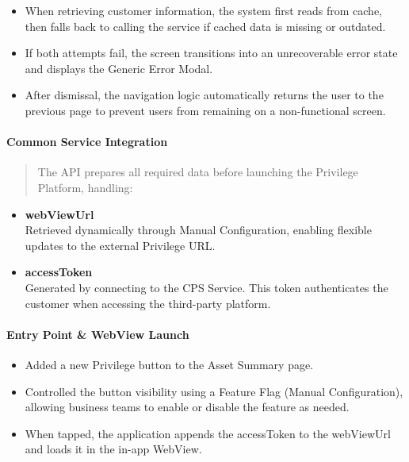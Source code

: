 \begin{itemize}
\item
  When retrieving customer information, the system first reads from
  cache, then falls back to calling the service if cached data is
  missing or outdated.
\item
  If both attempts fail, the screen transitions into an unrecoverable
  error state and displays the Generic Error Modal.
\item
  After dismissal, the navigation logic automatically returns the user
  to the previous page to prevent users from remaining on a
  non-functional screen.
\end{itemize}

\paragraph{\texorpdfstring{\textbf{Common Service
Integration}}{Common Service Integration}}\label{common-service-integration}

\begin{quote}
The API prepares all required data before launching the Privilege
Platform, handling:
\end{quote}

\begin{itemize}
\item
  \textbf{webViewUrl}\\
  Retrieved dynamically through Manual Configuration, enabling flexible
  updates to the external Privilege URL.
\item
  \textbf{accessToken\\
  }Generated by connecting to the CPS Service. This token authenticates
  the customer when accessing the third-party platform.
\end{itemize}

\paragraph{\texorpdfstring{\textbf{Entry Point \& WebView
Launch}}{Entry Point \& WebView Launch}}\label{entry-point-webview-launch}

\begin{itemize}
\item
  Added a new Privilege button to the Asset Summary page.
\item
  Controlled the button visibility using a Feature Flag (Manual
  Configuration), allowing business teams to enable or disable the
  feature as needed.
\item
  When tapped, the application appends the accessToken to the webViewUrl
  and loads it in the in-app WebView.
\end{itemize}

